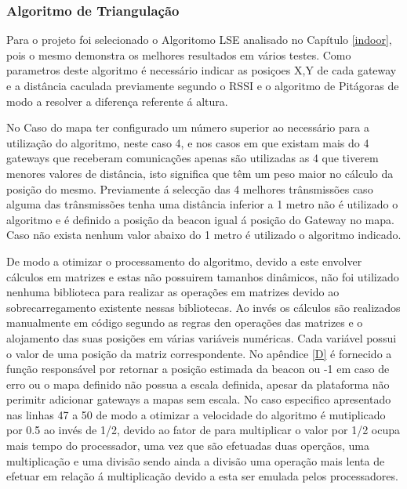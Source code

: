 \subsubsection{Algoritmo de Triangulação}

\par Para o projeto foi selecionado o Algoritomo LSE analisado no Capítulo \ref{indoor}, pois o mesmo demonstra os melhores resultados em vários testes. Como parametros deste algoritmo é necessário indicar as posiçoes X,Y de cada gateway e a distância caculada previamente segundo o RSSI e o algoritmo de Pitágoras de modo a resolver a diferença referente á altura.
\par No Caso do mapa ter configurado um número superior ao necessário para a utilização do algoritmo, neste caso 4, e nos casos em que existam mais do 4 gateways que receberam comunicações apenas são utilizadas as 4 que tiverem menores valores de distância, isto significa que têm um peso maior no cálculo da posição do mesmo. Previamente á selecção das 4 melhores trânsmissões caso alguma das trânsmissões tenha uma distância inferior a 1 metro não é utilizado o algoritmo e é definido a posição da beacon igual á posição do Gateway no mapa. Caso não exista nenhum valor abaixo do 1 metro é utilizado o algoritmo indicado.                                                                                                                                                                                                                                                                                                  
\par De modo a otimizar o processamento do algoritmo, devido a este envolver cálculos em matrizes e estas não possuirem tamanhos dinâmicos, não foi utilizado nenhuma biblioteca para realizar as operações em matrizes devido ao sobrecarregamento existente nessas bibliotecas. Ao invés os cálculos são realizados manualmente em código segundo as regras den operações das matrizes e o alojamento das suas posições em várias variáveis numéricas. Cada variável possui o valor de uma posição da matriz correspondente. No apêndice \ref{D} é fornecido a função responsável por retornar a posição estimada da beacon ou -1 em caso de erro ou o mapa definido não possua a escala definida, apesar da plataforma não perimitr adicionar gateways a mapas sem escala. No caso especifico apresentado nas linhas 47 a 50 de modo a otimizar a velocidade do algoritmo é mutiplicado por 0.5 ao invés de 1/2, devido ao fator de para multiplicar o valor por 1/2 ocupa mais tempo do processador, uma vez que  são efetuadas duas operçãos, uma multiplicação e uma divisão sendo ainda a divisão uma operação mais lenta de efetuar em relação á multiplicação devido a esta ser emulada pelos processadores.

